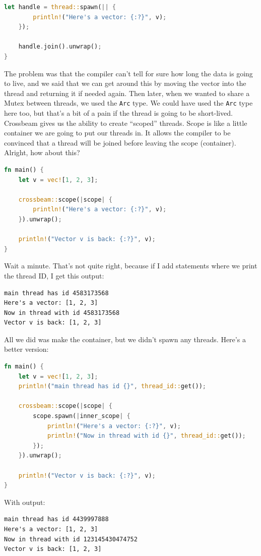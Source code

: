 \documentclass[a4paper]{report}
\begin{document}
\begin{appendices}
\begin{lstlisting}[language=Rust]
    let handle = thread::spawn(|| {
        println!("Here's a vector: {:?}", v);
    });

    handle.join().unwrap();
}
\end{lstlisting}

The problem was that the compiler can't tell for sure how long the data is going to live, and we said that we can get around this by moving the vector into the thread and returning it if needed again. Then later, when we wanted to share a Mutex between threads, we used the \texttt{Arc} type. We could have used the \texttt{Arc} type here too, but that's a bit of a pain if the thread is going to be short-lived. Crossbeam gives us the ability to create ``scoped'' threads. Scope is like a little container we are going to put our threads in. It allows the compiler to be convinced that a thread will be joined before leaving the scope (container). Alright, how about this?

\begin{lstlisting}[language=Rust]
fn main() {
    let v = vec![1, 2, 3];

    crossbeam::scope(|scope| {
        println!("Here's a vector: {:?}", v);
    }).unwrap();

    println!("Vector v is back: {:?}", v);
}
\end{lstlisting}

Wait a minute. That's not quite right, because if I add statements where we print the thread ID, I get this output:

{\scriptsize 
\begin{verbatim}
main thread has id 4583173568
Here's a vector: [1, 2, 3]
Now in thread with id 4583173568
Vector v is back: [1, 2, 3]
\end{verbatim}
}

All we did was make the container, but we didn't spawn any threads. Here's a better version:
\begin{lstlisting}[language=Rust]
fn main() {
    let v = vec![1, 2, 3];
    println!("main thread has id {}", thread_id::get());

    crossbeam::scope(|scope| {
        scope.spawn(|inner_scope| {
            println!("Here's a vector: {:?}", v);
            println!("Now in thread with id {}", thread_id::get());
        });
    }).unwrap();

    println!("Vector v is back: {:?}", v);
}
\end{lstlisting}
With output:

{\scriptsize 
\begin{verbatim}
main thread has id 4439997888
Here's a vector: [1, 2, 3]
Now in thread with id 123145430474752
Vector v is back: [1, 2, 3]
\end{verbatim}
}


\end{appendices}
\end{document}

